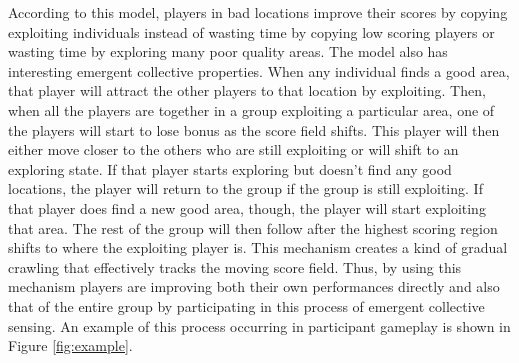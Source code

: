 \documentclass[12pt,letterpaper]{article}
\begin{document}
According to this model, players in bad locations improve their scores
by copying exploiting individuals instead of wasting time by copying
low scoring players or wasting time by exploring many poor quality
areas.  The model also has interesting emergent collective properties.
When any individual finds a good area, that player will attract the
other players to that location by exploiting.  Then, when all the
players are together in a group exploiting a particular area, one of
the players will start to lose bonus as the score field shifts.  This
player will then either move closer to the others who are still
exploiting or will shift to an exploring state.  If that player starts
exploring but doesn't find any good locations, the player will return
to the group if the group is still exploiting.  If that player does
find a new good area, though, the player will start exploiting that
area.  The rest of the group will then follow after the highest
scoring region shifts to where the exploiting player is.  This
mechanism creates a kind of gradual crawling that effectively tracks
the moving score field.  Thus, by using this mechanism players are
improving both their own performances directly and also that of the
entire group by participating in this process of emergent collective
sensing.  An example of this process occurring in participant gameplay
is shown in Figure \ref{fig:example}.
\end{document}

